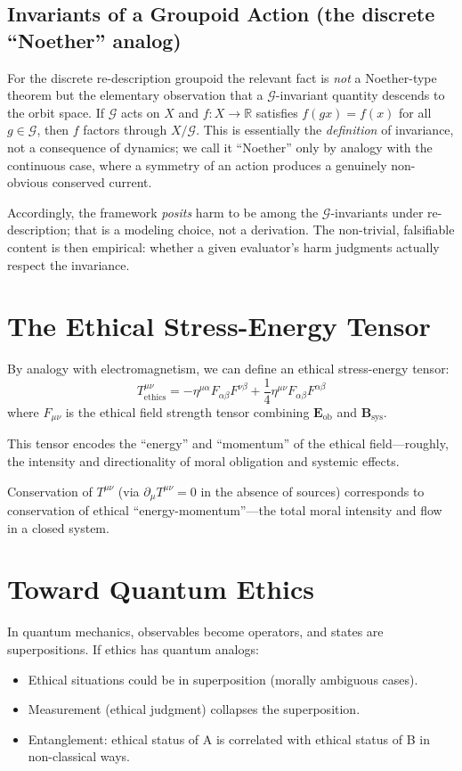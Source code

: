 \documentclass[12pt,letterpaper]{article}
\theoremstyle{definition}
\theoremstyle{remark}
\newcommand{\R}{\mathbb{R}}
\newcommand{\G}{\mathcal{G}}
\begin{document}
\subsection{Invariants of a Groupoid Action (the discrete ``Noether'' analog)}

For the discrete re-description groupoid the relevant fact is \emph{not} a Noether-type theorem but the elementary observation that a $\G$-invariant quantity descends to the orbit space. If $\G$ acts on $X$ and $f: X \to \R$ satisfies $f(gx) = f(x)$ for all $g \in \G$, then $f$ factors through $X/\G$. This is essentially the \emph{definition} of invariance, not a consequence of dynamics; we call it ``Noether'' only by analogy with the continuous case, where a symmetry of an action produces a genuinely non-obvious conserved current.

Accordingly, the framework \emph{posits} harm to be among the $\G$-invariants under re-description; that is a modeling choice, not a derivation. The non-trivial, falsifiable content is then empirical: whether a given evaluator's harm judgments actually respect the invariance.

\section{The Ethical Stress-Energy Tensor}

By analogy with electromagnetism, we can define an ethical stress-energy tensor:
\begin{equation}
T^{\mu\nu}_\text{ethics} = -\eta^{\mu\alpha} F_{\alpha\beta} F^{\nu\beta} + \frac{1}{4} \eta^{\mu\nu} F_{\alpha\beta} F^{\alpha\beta}
\end{equation}
where $F_{\mu\nu}$ is the ethical field strength tensor combining $\mathbf{E}_\text{ob}$ and $\mathbf{B}_\text{sys}$.

This tensor encodes the ``energy'' and ``momentum'' of the ethical field---roughly, the intensity and directionality of moral obligation and systemic effects.

Conservation of $T^{\mu\nu}$ (via $\partial_\mu T^{\mu\nu} = 0$ in the absence of sources) corresponds to conservation of ethical ``energy-momentum''---the total moral intensity and flow in a closed system.

\section{Toward Quantum Ethics}

In quantum mechanics, observables become operators, and states are superpositions. If ethics has quantum analogs:
\begin{itemize}
    \item Ethical situations could be in superposition (morally ambiguous cases).
    \item Measurement (ethical judgment) collapses the superposition.
    \item Entanglement: ethical status of A is correlated with ethical status of B in non-classical ways.
\end{itemize}
\end{document}

